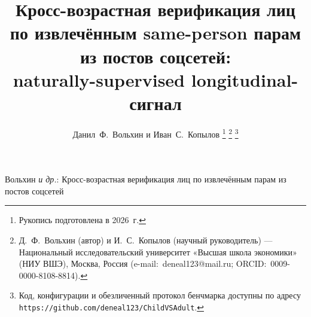 \documentclass[journal]{IEEEtran}
\begin{document}
\title{Кросс-возрастная верификация лиц по извлечённым same-person парам из постов соцсетей:\\ naturally-supervised longitudinal-сигнал}

\author{Данил~Ф.~Вольхин и Иван~С.~Копылов%
\thanks{Рукопись подготовлена в 2026~г.}%
\thanks{Д.~Ф.~Вольхин (автор) и И.~С.~Копылов (научный руководитель) --- Национальный исследовательский университет «Высшая школа экономики» (НИУ ВШЭ), Москва, Россия (e-mail:~deneal123@mail.ru; ORCID:~0009-0000-8108-8814).}%
\thanks{Код, конфигурации и обезличенный протокол бенчмарка доступны по адресу \texttt{https://github.com/deneal123/ChildVSAdult}.}}

%
{Вольхин \MakeLowercase{\textit{и др.}}: Кросс-возрастная верификация лиц по извлечённым парам из постов соцсетей}

\maketitle
\end{document}
